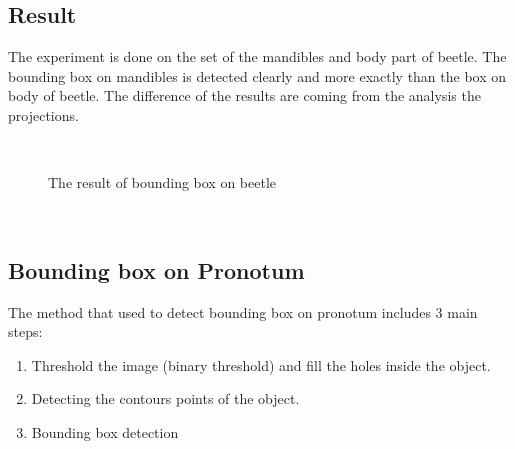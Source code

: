 \subsection{Result}
The experiment is done on the set of the mandibles and body part of beetle. The bounding box on mandibles is detected clearly and more exactly than the box on body of beetle. The difference of the results are coming from the analysis the projections. 
\begin{figure}[h!]
\centering
{}~~
\caption{The result of bounding box on beetle}
\label{figrboxes}
\end{figure}~\\[0.2cm]
\subsection{Bounding box on Pronotum}
The method that used to detect bounding box on pronotum includes 3 main steps:
\begin{enumerate}
	\item Threshold the image (binary threshold) and fill the holes inside the object.
	\item Detecting the contours points of the object.
	\item Bounding box detection
\end{enumerate}


